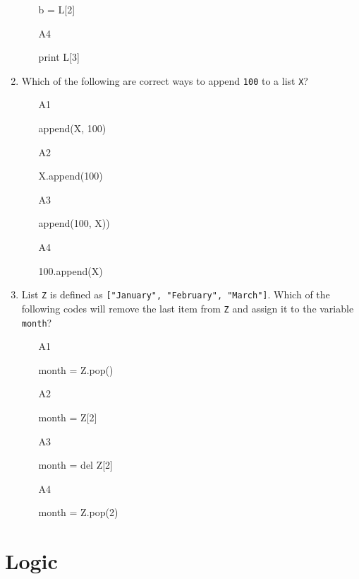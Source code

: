 \begin{enumerate}
\begin{enumerate}
\begin{bluecode}
b = L[2]
\end{bluecode}
\item[A4] 
\begin{bluecode}
print L[3]
\end{bluecode}
\end{enumerate}
\item Which of the following are correct ways to append {\tt 100} to a list {\tt X}?
\begin{enumerate}
\item[A1] 
\begin{bluecode}
append(X, 100)
\end{bluecode}
\item[A2] 
\begin{bluecode}
X.append(100)
\end{bluecode}
\item[A3] 
\begin{bluecode}
append(100, X))
\end{bluecode}
\item[A4] 
\begin{bluecode}
100.append(X)
\end{bluecode}
\end{enumerate}
\item List {\tt Z} is defined as {\tt ["January", "February", "March"]}.
Which of the following codes will remove the last item from {\tt Z} 
and assign it to the variable {\tt month}?
\begin{enumerate}
\item[A1] 
\begin{bluecode}
month = Z.pop()
\end{bluecode}
\item[A2] 
\begin{bluecode}
month = Z[2]
\end{bluecode}
\item[A3] 
\begin{bluecode}
month = del Z[2]
\end{bluecode}
\item[A4] 
\begin{bluecode}
month = Z.pop(2)
\end{bluecode}
\end{enumerate}
\end{enumerate}


\section{Logic}

